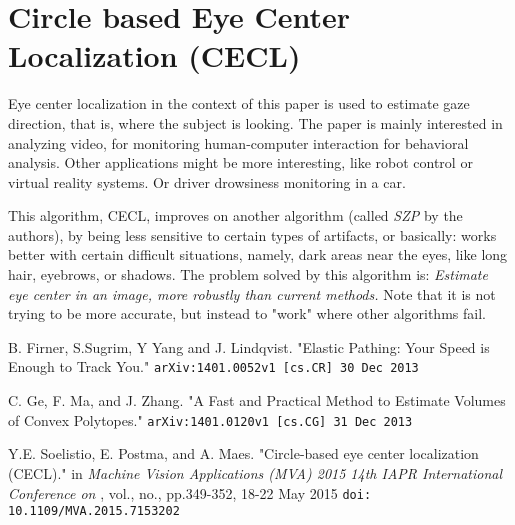 \documentclass[11pt]{article}
\begin{document}
\section{Circle based Eye Center Localization (CECL)\cite{Soelistio}}
Eye center localization in the context of this paper is used to estimate gaze direction, that is, where the subject is looking. The paper is mainly interested in analyzing video, for monitoring human-computer interaction for behavioral analysis. Other applications might be more interesting, like robot control or virtual reality systems. Or driver drowsiness monitoring in a car.

This algorithm, CECL, improves on another algorithm (called {\em SZP} by the authors), by being less sensitive to certain types of artifacts, or basically:  works better with certain difficult situations, namely, dark areas near the eyes, like long hair, eyebrows, or shadows.
The problem solved by this algorithm is:  {\em Estimate eye center in an image, more robustly than current methods.}  Note that it is not trying to be more accurate, but instead to "work" where other algorithms fail.

\begin{thebibliography}{10}

  B. Firner, S.Sugrim, Y Yang and J. Lindqvist. "Elastic Pathing: Your Speed is Enough to Track You." {\tt arXiv:1401.0052v1 [cs.CR] 30 Dec 2013}

 C. Ge, F. Ma,  and J. Zhang. "A Fast and Practical Method to Estimate Volumes of Convex Polytopes." {\tt arXiv:1401.0120v1 [cs.CG] 31 Dec 2013}


 Y.E. Soelistio, E. Postma, and A. Maes. "Circle-based eye center localization (CECL)." in {\em Machine Vision Applications (MVA) 2015 14th IAPR International Conference on} , vol., no., pp.349-352, 18-22 May 2015
{\tt doi: 10.1109/MVA.2015.7153202}


\end{thebibliography}
\end{document}
